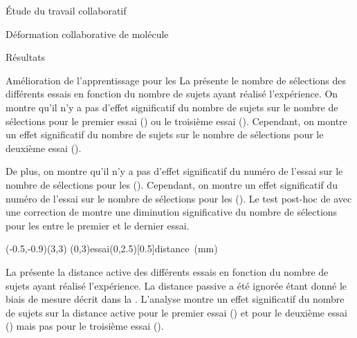 \documentclass[myfrancais]{mythesis}
\begin{document}
\begin{mypart}{Étude du travail collaboratif}
\begin{mychapter}{Déformation collaborative de molécule}
\begin{mysection}{Résultats}
\begin{mysubsection}{Amélioration de l'apprentissage pour les }
					La  présente le nombre de sélections  des différents essais  en fonction du nombre de sujets  ayant réalisé l'expérience.
					On montre qu'il n'y a pas d'effet significatif du nombre de sujets  sur le nombre de sélections  pour le premier essai () ou le troisième essai ().
					Cependant, on montre un effet significatif du nombre de sujets  sur le nombre de sélections  pour le deuxième essai ().

					De plus, on montre qu'il n'y a pas d'effet significatif du numéro de l'essai  sur le nombre de sélections  pour les  ().
					Cependant, on montre un effet significatif du numéro de l'essai  sur le nombre de sélections  pour les  ().
					Le test post-hoc de  avec une correction de  montre une diminution significative du nombre de sélections pour les  entre le premier et le dernier essai.

					\begin{myfigure}
						\begin{myps}(-0.5,-0.9)(3,3)
							\myaxes(0,3){essai}(0,2.5)[0.5]{distance~(mm)}
						\end{myps}
					\end{myfigure}

					La  présente la distance active  des différents essais  en fonction du nombre de sujets  ayant réalisé l'expérience.
					La distance passive a été ignorée étant donné le biais de mesure décrit dans la .
					L'analyse montre un effet significatif du nombre de sujets  sur la distance active  pour le premier essai () et pour le deuxième essai () mais pas pour le troisième essai ().


\end{mysubsection}
\end{mysection}
\end{mychapter}
\end{mypart}
\end{document}
